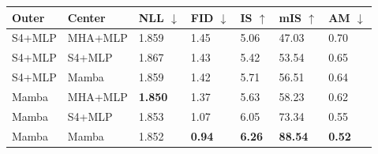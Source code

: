 \begin{tabular}{lllllll}
\hline
\textbf{Outer} & \textbf{Center} & \textbf{NLL $\downarrow$} & \textbf{FID $\downarrow$} & \textbf{IS $\uparrow$} & \textbf{mIS $\uparrow$} & \textbf{AM $\downarrow$} \\
\hline
S4+MLP & MHA+MLP & 1.859 & 1.45 & 5.06 & 47.03 & 0.70 \\
S4+MLP & S4+MLP & 1.867 & 1.43 & 5.42 & 53.54 & 0.65 \\
S4+MLP & Mamba & 1.859 & 1.42 & 5.71 & 56.51 & 0.64 \\
Mamba & MHA+MLP & \textbf{1.850} & 1.37 & 5.63 & 58.23 & 0.62 \\
Mamba & S4+MLP & 1.853 & 1.07 & 6.05 & 73.34 & 0.55 \\
Mamba & Mamba & 1.852 & \textbf{0.94} & \textbf{6.26} & \textbf{88.54} & \textbf{0.52} \\
\hline
\end{tabular}
